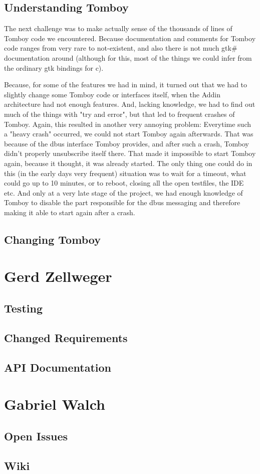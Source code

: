 \documentclass[11pt,a4paper,titlepage]{article}
\begin{document}
\subsection{Understanding Tomboy}
The next challenge was to make actually sense of the thousands of lines of Tomboy code we encountered. Because documentation and comments for Tomboy code ranges from very rare to not-existent, and also there is not much gtk\# documentation around (although for this, most of the things we could infer from the ordinary gtk bindings for c).

Because, for some of the features we had in mind, it turned out that we had to slightly change some Tomboy code or interfaces itself, when the Addin architecture had not enough features. And, lacking knowledge, we had to find out much of the things with "try and error", but that led to frequent crashes of Tomboy. Again, this resulted in another very annoying problem: Everytime such a "heavy crash" occurred, we could not start Tomboy again afterwards. That was because of the dbus interface Tomboy provides, and after such a crash, Tomboy didn't properly unsubscribe itself there. That made it impossible to start Tomboy again, because it thought, it was already started. The only thing one could do in this (in the early days very frequent) situation was to wait for a timeout, what could go up to 10 minutes, or to reboot, closing all the open testfiles, the IDE etc. And only at a very late stage of the project, we had enough knowledge of Tomboy to disable the part responsible for the dbus messaging and therefore making it able to start again after a crash.

\subsection{Changing Tomboy}

\section{Gerd Zellweger}

\subsection{Testing}

\subsection{Changed Requirements}

\subsection{API Documentation}

\section{Gabriel Walch}

\subsection{Open Issues}

\subsection{Wiki}
\end{document}
